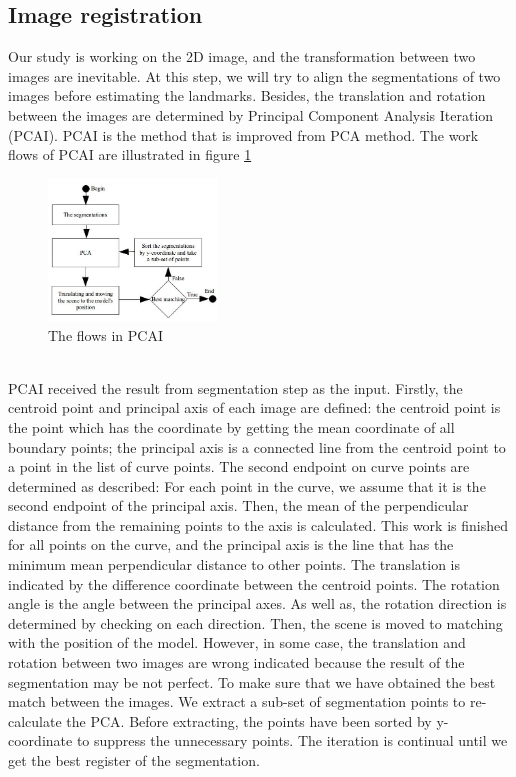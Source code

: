 \documentclass[twoside,twocolumn,10pt]{article}
\begin{document}
\subsection{Image registration}
Our study is working on the 2D image, and the transformation between
two images are inevitable. At this step, we will try to align the segmentations of two images before estimating the landmarks. Besides, the translation and rotation between the images are determined by Principal
Component Analysis Iteration (PCAI). PCAI is the method that is improved from PCA method\cite{shlens2014tutorial}. The work flows of PCAI are illustrated in figure \ref{fig:pcai}
\begin{figure}[htb]
    \centering
    \includegraphics[width=0.4\textwidth]{./images/pcadiagram}
    \caption{The flows in PCAI}
    \label{fig:pcai}
\end{figure}~\\
PCAI received the result from segmentation step as the input. Firstly, the centroid point and principal axis of each image are defined: the centroid point is the point which has the coordinate by getting the mean coordinate of all boundary points; the principal axis is a connected line from the centroid point to a point in the list of curve points. The second endpoint on curve points are determined as described: For each point in the curve, we assume that it is the second endpoint of the principal axis. Then, the mean of the perpendicular distance from the remaining points to the axis is calculated. This work is finished for all points on the curve, and the principal axis is the line that has the minimum mean perpendicular distance to other points. The translation is
indicated by the difference coordinate between the centroid points. The rotation angle is the angle between the principal axes. As well as, the
rotation direction is determined by checking on each direction. Then, the scene is moved to matching with the position of the model. However,
in some case, the translation and rotation between two images are
wrong indicated because the result of the segmentation may be not perfect. To make sure that we have obtained the best match
between the images. We extract a sub-set of segmentation points to re-calculate the PCA. Before extracting, the points have been sorted by y-coordinate to suppress the unnecessary points. The iteration is continual until we get the best register of the segmentation.\\
\end{document}
